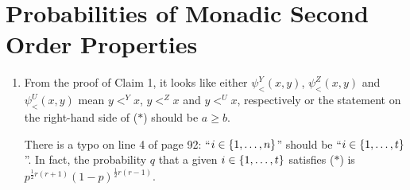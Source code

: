 \section{Probabilities of Monadic Second Order Properties}
\begin{enumerate}[1.]
%
\item {} From the proof of Claim 1, it looks like either $\psi^Y_<(x, y)$, $\psi^Z_<(x, y)$ and $\psi^U_<(x, y)$ mean $y <^Y x$, $y <^Z x$ and $y <^U x$, respectively or the statement on the right-hand side of ($\ast$) should be $a \geq b$.

There is a typo on line 4 of page 92: ``$i \in {\{1, \ldots, n\}}$'' should be ``$i \in {\{1, \ldots, t\}}$''. In fact, the probability $q$ that a given $i \in {\{1, \ldots, t\}}$ satisfies ($\ast$) is $p^{\frac{1}{2}r(r + 1)}(1 - p)^{\frac{1}{2}r(r - 1)}$.
%
\end{enumerate}


